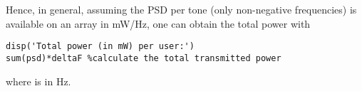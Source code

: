 

Hence, in general, assuming the PSD per tone (only non-negative frequencies) is available on an array  in mW/Hz, one can obtain the total power with
\begin{lstlisting}
disp('Total power (in mW) per user:')
sum(psd)*deltaF %calculate the total transmitted power
\end{lstlisting}
where  is in Hz.





%



